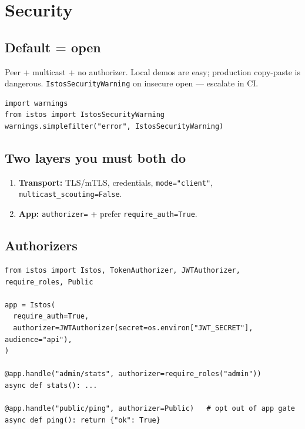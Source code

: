 \documentclass[11pt,a4paper]{article}
\begin{document}
\section{Security}

\subsection{Default = open}

Peer + multicast + no authorizer. Local demos are easy; production copy-paste is
dangerous. \texttt{IstosSecurityWarning} on insecure open --- escalate in CI.

\begin{lstlisting}
import warnings
from istos import IstosSecurityWarning
warnings.simplefilter("error", IstosSecurityWarning)
\end{lstlisting}

\subsection{Two layers you must both do}

\begin{enumerate}[leftmargin=*]
  \item \textbf{Transport:} TLS/mTLS, credentials, \texttt{mode="client"},
        \texttt{multicast\_scouting=False}.
  \item \textbf{App:} \texttt{authorizer=} + prefer \texttt{require\_auth=True}.
\end{enumerate}

\subsection{Authorizers}

\begin{lstlisting}
from istos import Istos, TokenAuthorizer, JWTAuthorizer, require_roles, Public

app = Istos(
  require_auth=True,
  authorizer=JWTAuthorizer(secret=os.environ["JWT_SECRET"], audience="api"),
)

@app.handle("admin/stats", authorizer=require_roles("admin"))
async def stats(): ...

@app.handle("public/ping", authorizer=Public)   # opt out of app gate
async def ping(): return {"ok": True}
\end{lstlisting}
\end{document}
